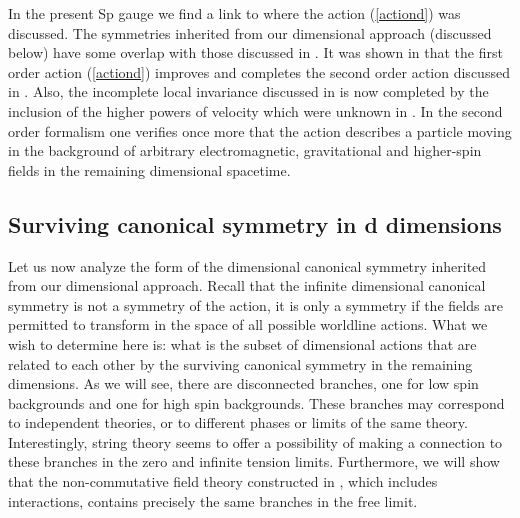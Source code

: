 \documentclass[a4paper,12pt]{article}
\begin{document}
In the present Sp\myHighlight{$\left( 2\right) $}\coordHE{} gauge we find a link to \cite{segal}
where the action (\ref{actiond}) was discussed. The symmetries inherited
from our \coordHE{} dimensional approach (discussed below) have some overlap with
those discussed in \cite{segal}. It was shown in \cite{segal} that the first
order action (\ref{actiond}) improves and completes the second order action
discussed in \cite{dwitf}. Also, the incomplete local invariance discussed
in \cite{dwitf} is now completed by the inclusion of the higher powers of
velocity which were unknown in \cite{dwitf}. In the second order formalism
one verifies once more that the action describes a particle moving in the
background of arbitrary electromagnetic, gravitational and higher-spin
fields in the remaining \coordHE{} dimensional spacetime.

\subsection{Surviving canonical symmetry in d dimensions}

Let us now analyze the form of the \coordHE{} dimensional canonical symmetry
inherited from our \coordHE{} dimensional approach. Recall that the infinite
dimensional canonical symmetry \coordHE{} is not a
symmetry of the action, it is only a symmetry if the fields are permitted to
transform in the space of all possible worldline actions. What we wish to
determine here is: what is the subset of \coordHE{} dimensional actions that are
related to each other by the surviving canonical symmetry in the remaining \coordHE{} dimensions. As we will see, there are disconnected branches, one for low
spin backgrounds and one for high spin backgrounds. These branches may
correspond to independent theories, or to different phases or limits of the
same theory. Interestingly, string theory seems to offer a possibility of
making a connection to these branches in the zero and infinite tension
limits. Furthermore, we will show that the non-commutative field theory
constructed in \cite{ncsp}, which includes interactions, contains precisely
the same branches in the free limit.
\end{document}
